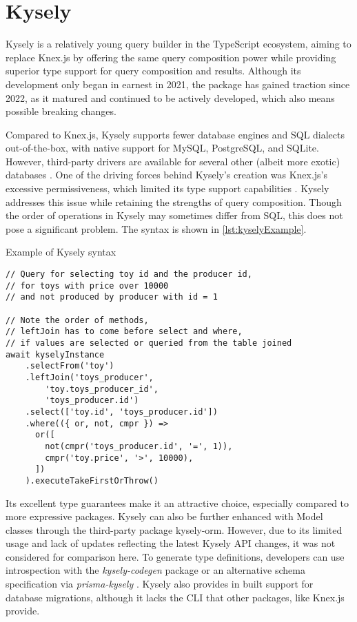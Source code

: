 \section{Kysely}
Kysely is a relatively young query builder in the TypeScript ecosystem, aiming
to replace Knex.js by offering the same query composition power while providing
superior type support for query composition and results. Although its
development only began in earnest in 2021, the package has gained traction since
2022, as it matured and continued to be actively developed, which also means
possible breaking changes.

Compared to Knex.js, Kysely supports fewer database engines and SQL dialects
out-of-the-box, with native support for MySQL, PostgreSQL, and SQLite. However,
third-party drivers are available for several other (albeit more exotic)
databases \cite{kyselyWeb}. One of the driving forces behind Kysely's creation
was Knex.js's excessive permissiveness, which limited its type support
capabilities \cite{kyselyGithub}. Kysely addresses this issue while retaining
the strengths of query composition. Though the order of operations in Kysely may
sometimes differ from SQL, this does not pose a significant problem. The syntax
is shown in \autoref{lst:kyselyExample}.

\begin{listing}[ht]
    \caption{Example of Kysely syntax}
    \label{lst:kyselyExample}
    \begin{verbatim}
// Query for selecting toy id and the producer id, 
// for toys with price over 10000 
// and not produced by producer with id = 1

// Note the order of methods, 
// leftJoin has to come before select and where, 
// if values are selected or queried from the table joined
await kyselyInstance
    .selectFrom('toy')
    .leftJoin('toys_producer', 
        'toy.toys_producer_id', 
        'toys_producer.id')
    .select(['toy.id', 'toys_producer.id'])
    .where(({ or, not, cmpr }) =>
      or([
        not(cmpr('toys_producer.id', '=', 1)),
        cmpr('toy.price', '>', 10000),
      ])
    ).executeTakeFirstOrThrow()
\end{verbatim}
\end{listing}

Its excellent type guarantees make it an attractive choice, especially compared
to more expressive packages. Kysely can also be further enhanced with Model
classes through the third-party package kysely-orm. However, due to its limited
usage and lack of updates reflecting the latest Kysely API changes, it was not
considered for comparison here. To generate type definitions, developers can use
introspection with the \textit{kysely-codegen} package \cite{kyselyCodegen} or
an alternative schema specification via \textit{prisma-kysely}
\cite{kyselyPrisma}. Kysely also provides in built support for database
migrations, although it lacks the CLI that other packages, like Knex.js
provide.

